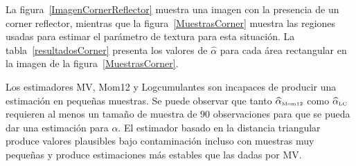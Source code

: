 
La figura~\ref{ImagenCornerReflector} muestra una imagen con la presencia de un corner reflector, mientras que la figura~\ref{MuestrasCorner} muestra las regiones usadas para estimar el parámetro de textura para esta situación. La tabla~\ref{resultadosCorner} presenta los valores de  $\widehat{\alpha}$ para cada área rectangular en la imagen de la figura~\ref{MuestrasCorner}.

Los estimadores MV, Mom12 y  Logcumulantes son incapaces de producir una estimación en pequeñas muestras.  Se puede observar que tanto $\widehat\alpha_{\text{\tiny{Mom12}}}$ como $\widehat\alpha_{\text{\tiny{LC}}}$ requieren al menos un tamaño de muestra de $90$ observaciones para que se pueda dar una estimación para $\alpha$. El estimador basado en la distancia triangular produce valores plausibles bajo contaminación incluso con muestras muy pequeñas y produce estimaciones más estables que las dadas por MV.

